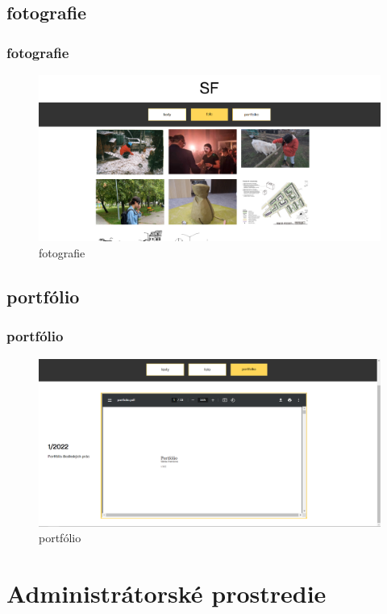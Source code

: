 \subsection{fotografie}
\begin{frame}\frametitle{fotografie}
  \begin{figure}[htb]
    \centering
    \includegraphics[scale=0.3]{galeria.png}
    \caption{fotografie}
  \end{figure}

\end{frame}

\subsection{portfólio}
\begin{frame}\frametitle{portfólio}
  \begin{figure}[htb]
    \centering
    \includegraphics[scale=0.3]{portfolko.png}
    \caption{portfólio}
  \end{figure}

\end{frame}
\section{Administrátorské prostredie}
